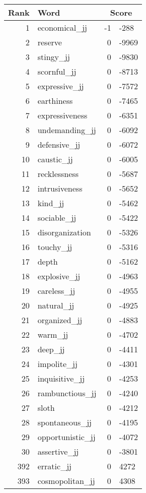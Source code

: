 \begin{longtable}[!htbp]{| rlr@{.}l |}
    \hline
    \textbf{Rank} & \textbf{Word} & \multicolumn{2}{c|}{\textbf{Score}} \\
    \hline
    \endhead
    1 & economical\_jj & -1 & -288 \\
    2 & reserve & 0 & -9969 \\
    3 & stingy\_jj & 0 & -9830 \\
    4 & scornful\_jj & 0 & -8713 \\
    5 & expressive\_jj & 0 & -7572 \\
    6 & earthiness & 0 & -7465 \\
    7 & expressiveness & 0 & -6351 \\
    8 & undemanding\_jj & 0 & -6092 \\
    9 & defensive\_jj & 0 & -6072 \\
    10 & caustic\_jj & 0 & -6005 \\
    11 & recklessness & 0 & -5687 \\
    12 & intrusiveness & 0 & -5652 \\
    13 & kind\_jj & 0 & -5462 \\
    14 & sociable\_jj & 0 & -5422 \\
    15 & disorganization & 0 & -5326 \\
    16 & touchy\_jj & 0 & -5316 \\
    17 & depth & 0 & -5162 \\
    18 & explosive\_jj & 0 & -4963 \\
    19 & careless\_jj & 0 & -4955 \\
    20 & natural\_jj & 0 & -4925 \\
    21 & organized\_jj & 0 & -4883 \\
    22 & warm\_jj & 0 & -4702 \\
    23 & deep\_jj & 0 & -4411 \\
    24 & impolite\_jj & 0 & -4301 \\
    25 & inquisitive\_jj & 0 & -4253 \\
    26 & rambunctious\_jj & 0 & -4240 \\
    27 & sloth & 0 & -4212 \\
    28 & spontaneous\_jj & 0 & -4195 \\
    29 & opportunistic\_jj & 0 & -4072 \\
    30 & assertive\_jj & 0 & -3801 \\
    392 & erratic\_jj & 0 & 4272 \\
    393 & cosmopolitan\_jj & 0 & 4308 \\

\end{longtable}

